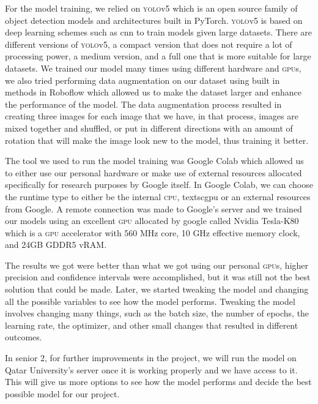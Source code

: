 \documentclass[../main.tex]{subfiles}
\begin{document}
For the model training, we relied on \textsc{yolo}v5 which is an open
source family of object detection models and architectures built in 
PyTorch. \textsc{yolo}v5 is based on deep learning schemes such as 
\gls{cnn} to train models given large datasets. There are different
versions of \textsc{yolo}v5, a compact version that does not
require a lot of processing power, a medium version, and a full one that
is more suitable for large datasets. We trained our model many times 
using different hardware and \textsc{gpu}s, we also tried performing 
data augmentation on our dataset using built in methods in Roboflow 
which allowed us to make the dataset larger and enhance the performance 
of the model. The data augmentation process resulted in creating three 
images for each image that we have, in that process, images are mixed
together and shuffled, or put in different directions with an amount of
rotation that will make the image look new to the model, 
thus training it better.

The tool we used to run the model training was Google 
Colab which allowed us to either use our personal hardware or 
make use of external resources allocated specifically for research 
purposes by Google itself. In Google Colab, we can choose the runtime 
type to either be the internal \textsc{cpu}, textsc{gpu} or an external 
resources from Google. A remote connection was made to Google's server 
and we trained our models using an excellent \textsc{gpu} 
allocated by google called Nvidia Tesla-K80 which is a \textsc{gpu} 
accelerator with 560 MHz core, 10 GHz effective memory clock, and 24GB 
GDDR5 vRAM.

The results we got were better than what we got using our personal 
\textsc{gpu}s, higher precision and confidence intervals were 
accomplished, but it was still not the best solution that could be made. 
Later, we started tweaking the model and changing all the possible 
variables to see how the model performs. Tweaking the model involves 
changing many things, such as the batch size, the number of epochs, the 
learning rate, the optimizer, and other small changes that resulted in 
different outcomes. 

In senior 2, for further improvements in the project, we will run the model 
on Qatar University's server once it is working properly and we have access 
to it. This will give us more options to see how the model performs and decide the 
best possible model for our project.

\end{document}
